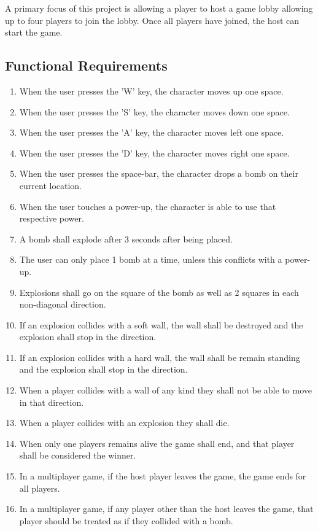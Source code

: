 \documentclass[12pt, titlepage]{article}
\begin{document}
A primary focus of this project is allowing a player to host a game lobby allowing up to four players to join the lobby. Once all players have joined, the host can start the game.

\subsection{Functional Requirements}
\begin{enumerate}[{FR}1. ]
    \item When the user presses the 'W' key, the character moves up one space.
    \item When the user presses the 'S' key, the character moves down one space.
    \item When the user presses the 'A' key, the character moves left one space.
    \item When the user presses the 'D' key, the character moves right one space.
    \item When the user presses the space-bar, the character drops a bomb on their current location.
    \item When the user touches a power-up, the character is able to use that respective power.
    \item A bomb shall explode after 3 seconds after being placed.
    \item The user can only place 1 bomb at a time, unless this conflicts with a power-up.
    \item Explosions shall go on the square of the bomb as well as 2 squares in each non-diagonal direction.
    \item If an explosion collides with a soft wall, the wall shall be destroyed and the explosion shall stop in the direction.
    \item If an explosion collides with a hard wall, the wall shall be remain standing and the explosion shall stop in the direction.
    \item When a player collides with a wall of any kind they shall not be able to move in that direction.
    \item When a player collides with an explosion they shall die.
    \item When only one players remains alive the game shall end, and that player shall be considered the winner.
    \item In a multiplayer game, if the host player leaves the game, the game ends for all players.
    \item In a multiplayer game, if any player other than the host leaves the game, that player should be treated as if they collided with a bomb.

    
\end{enumerate}
\end{document}
